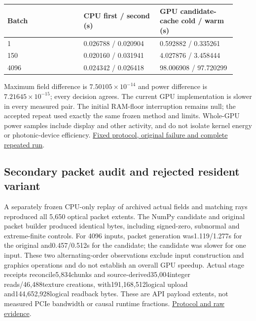 \documentclass[11pt]{article}
\begin{document}
\begin{small}\begin{longtable}{@{}p{0.307\linewidth} p{0.307\linewidth} p{0.307\linewidth}@{}}\toprule
Batch & CPU first / second (s) & GPU candidate-cache cold / warm (s) \\
\midrule
1 & 0.026788 / 0.020904 & 0.592882 / 0.335261 \\
150 & 0.020160 / 0.031941 & 4.027876 / 3.458444 \\
4096 & 0.024342 / 0.026418 & 98.006908 / 97.720299 \\
\bottomrule\end{longtable}\end{small}

Maximum field difference is $7.50105\times10^{-14}$ and power difference is $7.21645\times10^{-15}$; every decision agrees. The current GPU implementation is slower in every measured pair. The initial RAM-floor interruption remains null; the accepted repeat used exactly the same frozen method and limits. Whole-GPU power samples include display and other activity, and do not isolate kernel energy or photonic-device efficiency. \href{https://github.com/Agnuxo1/Neuro3D/blob/a6d0fbec5011bdc76abad71edac86519016348f4/Docs/NATIVE\_GRAPHICS\_SCALING\_PROTOCOL\_2026-10-09.md}{Fixed protocol, original failure and complete repeated run}.

\subsection*{Secondary packet audit and rejected resident variant}

A separately frozen CPU-only replay of archived actual fields and matching rays reproduced all 5,650 optical packet extents. The NumPy candidate and original packet builder produced identical bytes, including signed-zero, subnormal and extreme-finite controls. For 4096 inputs, packet generation was1.119/1.277s for the original and0.457/0.512s for the candidate; the candidate was slower for one input. These two alternating-order observations exclude input construction and graphics operations and do not establish an overall GPU speedup. Actual stage receipts reconcile5,834chunks and source-derived35,004integer reads/46,488texture creations, with191,168,512logical upload and144,652,928logical readback bytes. These are API payload extents, not measured PCIe bandwidth or causal runtime fractions. \href{https://github.com/Agnuxo1/Neuro3D/blob/a6d0fbec5011bdc76abad71edac86519016348f4/Docs/NATIVE\_PACKET\_WORKLOAD\_PROTOCOL\_2026-10-09.md}{Protocol and raw evidence}.
\end{document}
